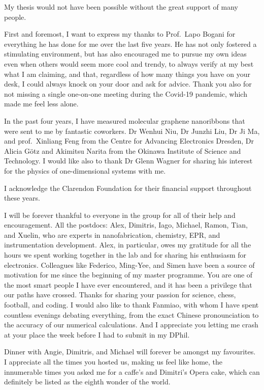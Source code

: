 
My thesis would not have been possible without the great support of many people.

First and foremost, I want to express my thanks to Prof.\ Lapo Bogani for everything he has done for me over the last five years. He has not only fostered a stimulating environment, but has also encouraged me to pursue my own ideas even when others would seem more cool and trendy, to always verify at my best what I am claiming, and that, regardless of how many things you have on your desk, I could always knock on your door and ask for advice. Thank you also for not missing a single one-on-one meeting during the Covid-19 pandemic, which made me feel less alone.

In the past four years, I have measured molecular graphene nanoribbons that were sent to me by fantastic coworkers. Dr Wenhui Niu, Dr Junzhi Liu, Dr Ji Ma, and prof.\ Xinliang Feng from the Centre for Advancing Electronics Dresden, Dr Alicia G{\"o}tz and Akimitsu Narita from the Okinawa Institute of Science and Technology. I would like also to thank Dr Glenn Wagner for sharing his interest for the physics of one-dimensional systems with me.

I acknowledge the Clarendon Foundation for their financial support throughout these years.

I will be forever thankful to everyone in the group for all of their help and encouragement. All the postdocs: Alex, Dimitris, Iago, Michael, Ramon, Tian, and Xuelin, who are experts in nanofabrication, chemistry, EPR, and instrumentation development. Alex, in particular, owes my gratitude for all the hours we spent working together in the lab and for sharing his enthusiasm for electronics. Colleagues like Federico, Ming-Yee, and Simen have been a source of motivation for me since the beginning of my master programme. You are one of the most smart people I have ever encountered, and it has been a privilege that our paths have crossed. Thanks for sharing your passion for science, chess, football, and coding. I would also like to thank Fanmiao, with whom I have spent countless evenings debating everything, from the exact Chinese pronounciation to the accuracy of our numerical calculations. And I appreciate you letting me crash at your place the week before I had to submit in my DPhil.

Dinner with Angie, Dimitris, and Michael will forever be amongst my favourites. I appreciate all the times you hosted us, making us feel like home, the innumerable times you asked me for a caffe's and Dimitri's Opera cake, which can definitely be listed as the eighth wonder of the world.

